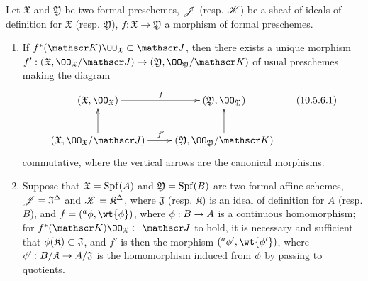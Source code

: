 \begin{prop}[10.5.6]
\label{1.10.5.6}
Let $\mathfrak{X}$ and $\mathfrak{Y}$ be two formal preschemes, $\mathscr{J}$ (resp. $\mathscr{K}$) be a sheaf of ideals of definition for $\mathfrak{X}$ (resp. $\mathfrak{Y}$), $f:\mathfrak{X}\to\mathfrak{Y}$ a morphism of formal preschemes.
\begin{enumerate}[label=\emph{(\roman*)}]
  \item If $f^*(\sh{K})\OO_\mathfrak{X}\subset\sh{J}$, then there exists a unique morphism $f':(\mathfrak{X},\OO_\mathfrak{X}/\sh{J})\to(\mathfrak{Y},\OO_\mathfrak{Y}/\sh{K})$ of usual preschemes making the diagram
    \[
      \xymatrix{
        (\mathfrak{X},\OO_\mathfrak{X})\ar[r]^f &
        (\mathfrak{Y},\OO_\mathfrak{Y})\\
        (\mathfrak{X},\OO_\mathfrak{X}/\sh{J})\ar[r]^{f'}\ar[u] &
        (\mathfrak{Y},\OO_\mathfrak{Y}/\sh{K})\ar[u]
      }
      \tag{10.5.6.1}
    \]
    commutative, where the vertical arrows are the canonical morphisms.
  \item Suppose that $\mathfrak{X}=\operatorname{Spf}(A)$ and $\mathfrak{Y}=\operatorname{Spf}(B)$ are two formal affine schemes, $\mathscr{J}=\mathfrak{J}^\Delta$ and $\mathscr{K}=\mathfrak{K}^\Delta$, where $\mathfrak{J}$ (resp. $\mathfrak{K}$) is an ideal of definition for $A$ (resp. $B$), and $f=({}^a\vphi,\wt{\vphi})$, where $\vphi:B\to A$ is a continuous homomorphism;
    for $f^*(\sh{K})\OO_\mathfrak{X}\subset\sh{J}$ to hold, it is necessary and sufficient that $\phi(\mathfrak{K})\subset\mathfrak{J}$, and $f'$ is then the morphism $({}^a\vphi',\wt{\vphi'})$, where $\vphi':B/\mathfrak{K}\to A/\mathfrak{J}$ is the homomorphism induced from $\phi$ by passing to quotients.
\end{enumerate}
\end{prop}

